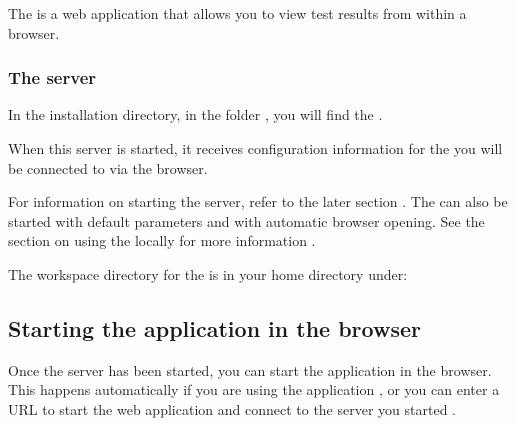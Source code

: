 The \dash{} is a web application that allows you to view test results from within a browser. 

\subsubsection{The \dash{} server}
In the installation directory, in the folder , you will find the . 

When this server is started, it receives configuration information for the 
\gddb{} you will be connected to via the browser. 

For information on starting the server, refer to the later section . The \dash{} can also be started with default parameters and with automatic browser opening. See the section on using the \dash{} locally for more information .

The workspace directory for the \dash{} is in your home directory under:\\

\subsection{Starting the \dash{} application in the browser}
Once the \dash{} server has been started, you can start the \dash{} application in the browser. This happens automatically if you are using the  application , or you can enter a URL to start the web application and connect to the server you started . 
